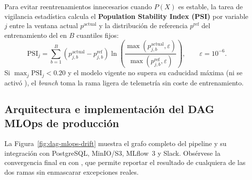Para evitar reentrenamientos innecesarios cuando $P(X)$ es estable, la tarea de vigilancia estadística calcula el \textbf{Population Stability Index (PSI)} por variable $j$ entre la ventana actual $p^{\text{actual}}$ y la distribución de referencia $p^{\text{ref}}$ del entrenamiento del  en $B$ cuantiles fijos:
\begin{equation}\label{eq:psi-produccion}
  \mathrm{PSI}_j = \sum_{b=1}^{B} \left(p_{j,b}^{\text{actual}} - p_{j,b}^{\text{ref}}\right) \ln\!\left(\frac{\max(p_{j,b}^{\text{actual}}, \varepsilon)}{\max(p_{j,b}^{\text{ref}}, \varepsilon)}\right), \qquad \varepsilon = 10^{-6}.
\end{equation}
Si $\max_j \mathrm{PSI}_j < 0.20$ y el modelo vigente no supera su caducidad máxima (ni se activó ), el \textit{branch} toma la rama ligera de telemetría sin coste de entrenamiento.

\subsection{Arquitectura e implementación del DAG MLOps de producción}

La Figura~\ref{fig:dag-mlops-drift} muestra el grafo completo del pipeline y su integración con PostgreSQL, MinIO/S3, MLflow~3 y Slack. Obsérvese la convergencia final en  con , que permite reportar el resultado de cualquiera de las dos ramas sin enmascarar excepciones reales.

